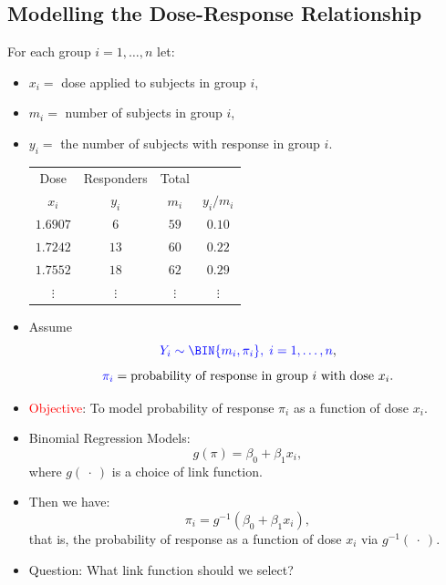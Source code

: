 \documentclass{article}\usepackage[]{graphicx}\usepackage[svgnames]{xcolor}
\begin{document}
\subsection*{Modelling the Dose-Response Relationship}
For each group $ i=1,\ldots,n $ let:
\begin{itemize}
      \item $ x_i= $ dose applied to subjects in group $ i $,
      \item $ m_i= $ number of subjects in group $ i $,
      \item $ y_i= $ the number of subjects with response in group $ i $.
            \begin{table}[!htbp]
                  \centering
                  \begin{tabular}{cccc}
                        \toprule
                        Dose       & Responders & Total                  \\
                        $ x_i $    & $ y_i $    & $ m_i $  & $ y_i/m_i $ \\
                        \midrule
                        $ 1.6907 $ & $ 6 $      & $ 59 $   & $ 0.10 $    \\
                        $ 1.7242 $ & $ 13 $     & $ 60 $   & $ 0.22 $    \\
                        $ 1.7552 $ & $ 18 $     & $ 62 $   & $ 0.29 $    \\
                        $\vdots$   & $\vdots$   & $\vdots$ & $\vdots$    \\
                        \bottomrule
                  \end{tabular}
            \end{table}
      \item Assume
            \[ \textcolor{Blue}{Y_i \sim \BIN{m_i,\pi_i},\; i=1,\ldots,n}, \]
            \[ \textcolor{Blue}{\pi_i} = \text{probability of response in group $ i $ with dose $ x_i $}. \]
      \item \textcolor{Red}{Objective}: To model probability of response $ \pi_i $ as a function of dose $ x_i $.
      \item Binomial Regression Models:
            \[ g(\pi)=\beta_0+\beta_1x_i, \]
            where $ g(\:\cdot\:) $ is a choice of link function.
      \item Then we have:
            \[ \pi_i=g^{-1}(\beta_0+\beta_1x_i), \]
            that is, the probability of response as a function of dose $ x_i $ via $ g^{-1}(\:\cdot\:) $.
      \item Question: What link function should we select?

\end{itemize}
\end{document}
